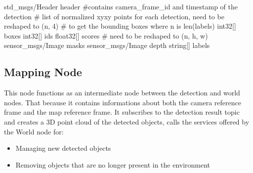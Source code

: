 \begin{python}
std_msgs/Header header #contains camera_frame_id and timestamp of the detection
# list of normalized xyxy points for each detection, need to be reshaped to (n, 4)
# to get the bounding boxes where n is len(labels)
int32[] boxes
int32[] ids
float32[] scores
# need to be reshaped to (n, h, w)
sensor_msgs/Image masks
sensor_msgs/Image depth
string[] labels
\end{python}

\subsection[Mapping Node]{Mapping Node}
This node functions as an intermediate node between the detection and world nodes. 
That because it contains informations about both the camera reference frame and the map reference frame.
It subscribes to the detection result topic and creates a 3D point cloud of the detected objects,
calls the services offered by the World node for:
\begin{itemize}
    \item Managing new detected objects
    \item Removing objects that are no longer present in the environment
\end{itemize}



